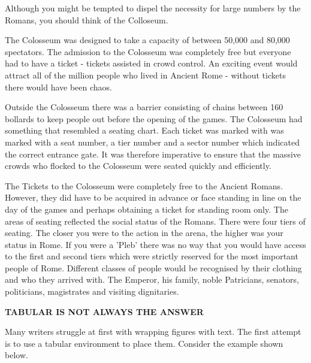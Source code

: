 \begin{multicols}{2}

Although you might be tempted to dispel the necessity for large numbers by the Romans, you should think of the Colloseum. 

The Colosseum was designed to take a capacity of between 50,000 and 80,000 spectators. The admission to the Colosseum was completely free but everyone had to have a ticket - tickets assisted in crowd control. An exciting event would attract all of the million people who lived in Ancient Rome - without tickets there would have been chaos. 

Outside the Colosseum there was a barrier consisting of chains between 160 bollards to keep people out before the opening of the games. The Colosseum had something that resembled a seating chart. Each ticket was marked with was marked with a seat number, a tier number and a sector number which indicated the correct entrance gate. It was therefore imperative to ensure that the massive crowds who flocked to the Colosseum were seated quickly and efficiently.

The Tickets to the Colosseum were completely free to the Ancient Romans. However, they did have to be acquired in advance or face standing in line on the day of the games and perhaps obtaining a ticket for standing room only. The areas of seating reflected the social status of the Romans. There were four tiers of seating. The closer you were to the action in the arena, the higher was your status in Rome. If you were a 'Pleb' there was no way that you would have access to the first and second tiers which were strictly reserved for the most important people of Rome. Different classes of people would be recognised by their clothing and who they arrived with. The Emperor, his family, noble Patricians, senators, politicians, magistrates and visiting dignitaries.
\end{multicols}


\clearpage
\textbf{\Large TABULAR IS NOT ALWAYS THE ANSWER}
\medskip

Many writers struggle at first with wrapping figures with text. The first attempt is to use a tabular
environment to place them. Consider the example shown below.



